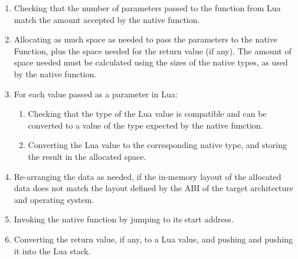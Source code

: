 \begin{enumerate}

	\item Checking that the number of parameters passed to the function from Lua
	match the amount accepted by the native function.

	\item Allocating as much space as needed to pass the parameters to
	the native Function, plus the space needed for the return value (if any).
	The amount of space needed must be calculated using the sizes of the native
	types, as used by the native function.

	\item For each value passed as a parameter in Lua:

		\begin{enumerate}

			\item Checking that the type of the Lua value is compatible and can be
			converted to a value of the type expected by the native function.

			\item Converting the Lua value to the corresponding native type, and
				storing the result in the allocated space.

		\end{enumerate}

	\item Re-arranging the data as needed, if the in-memory layout of the
		allocated data does not match the layout defined by the \gls{ABI} of the
		target architecture and operating system.

	\item Invoking the native function by jumping to its start address.

	\item Converting the return value, if any, to a Lua value, and pushing
		and pushing it into the Lua stack.

\end{enumerate}


\beforeintro
